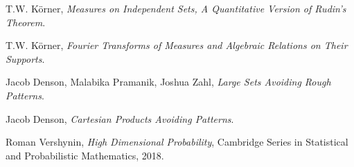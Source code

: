 \documentclass[12pt,reqno]{article}
\begin{document}
\begin{thebibliography}{9}

    T.W. K\"{o}rner,
    \textit{Measures on Independent Sets, A Quantitative Version of Rudin's Theorem}.

    T.W. K\"{o}rner,
    \textit{Fourier Transforms of Measures and Algebraic Relations on Their Supports}.

    Jacob Denson, Malabika Pramanik, Joshua Zahl,
    \textit{Large Sets Avoiding Rough Patterns}.

    Jacob Denson,
    \textit{Cartesian Products Avoiding Patterns}.

    Roman Vershynin,
    \textit{High Dimensional Probability},
    Cambridge Series in Statistical and Probabilistic Mathematics,
    2018.

\end{thebibliography}
\end{document}
